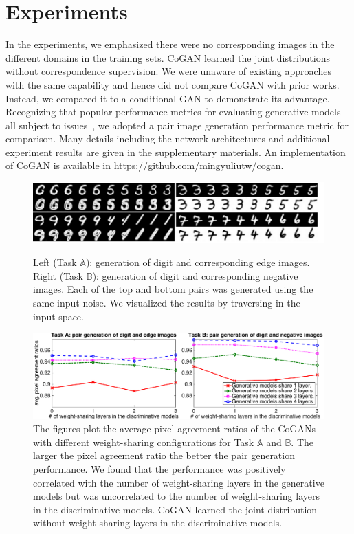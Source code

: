 \section{Experiments}\label{sec::expr}

In the experiments, we emphasized there were no corresponding images in the different domains in the training sets. CoGAN learned the joint distributions without correspondence supervision. We were unaware of existing approaches with the same capability and hence did not compare CoGAN with prior works. Instead, we compared it to a conditional GAN to demonstrate its advantage. Recognizing that popular performance metrics for evaluating generative models all subject to issues~\cite{theis2015note}, we adopted a pair image generation performance metric for comparison. Many details including the network architectures and additional experiment results are given in the supplementary materials. An implementation of CoGAN is available in \url{https://github.com/mingyuliutw/cogan}. 


\begin{figure}[t]
\centering
\includegraphics[trim=0.0in 0.12in 0.1in 0.in, width=1.0\textwidth]{result_mnist_small.pdf}
\caption{\small Left (Task $\mathbb{A}$): generation of digit and corresponding edge images. Right (Task $\mathbb{B}$): generation of digit and corresponding negative images. Each of the top and bottom pairs was generated using the same input noise. We visualized the results by traversing in the input space.}
\label{fig::result_mnist}
\centering
\includegraphics[trim=0.in 0.1in 0.in 0in, width=1.0\textwidth]{weight-sharing.pdf}
\caption{\small The figures plot the average pixel agreement ratios of the CoGANs with different weight-sharing configurations for Task $\mathbb{A}$ and $\mathbb{B}$. The larger the pixel agreement ratio the better the pair generation performance. We found that the performance was positively correlated with the number of weight-sharing layers in the generative models but was uncorrelated to the number of weight-sharing layers in the discriminative models. CoGAN learned the joint distribution without weight-sharing layers in the discriminative models.}
\label{fig::quantitative_digit}
\vspace{-2mm}
\end{figure}

